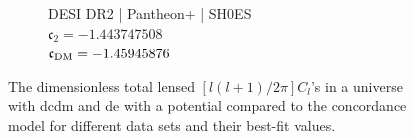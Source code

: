\begin{figure}[htbp]
	\vspace{0.35em}

	\hspace*{\fill}
	\begin{subfigure}[t]{0.49\textwidth}
		\centering
		\resizebox{\linewidth}{!}{%
		}
		\caption{DESI DR2 | Pantheon+ | SH0ES\\$\mathfrak{c}_2 = -1.443747508$\\$\mathfrak{c}_{\textnormal{DM}} = -1.45945876$}
		\label{fig:HyperbolicCl:PPSD}
	\end{subfigure}
	\hspace*{\fill}

	\tagstructend
	\caption[Total lensed $C_l$'s.]{The dimensionless total lensed $[l(l+1)/2\pi] C_l$'s in a universe with \gls{dc}\gls{dm} and \gls{de} with a  potential compared to the concordance model for different data sets and their best-fit values.}
	\label{fig:HyperbolicCl}
\end{figure}
